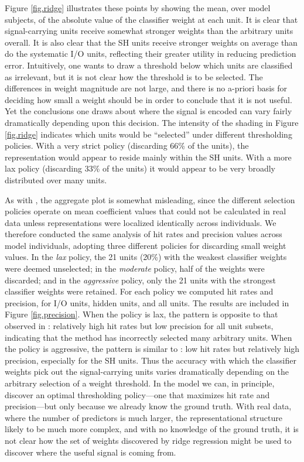 Figure \ref{fig.ridge} illustrates these points by showing the mean, over model subjects, of the absolute value of the classifier weight at each unit. It is clear that signal-carrying units receive somewhat stronger weights than the arbitrary units overall. It is also clear that the SH units receive stronger weights on average than do the systematic I/O units, reflecting their greater utility in reducing prediction error. Intuitively, one wants to draw a threshold below which units are classified as irrelevant, but it is not clear how the threshold is to be selected. The differences in weight magnitude are not large, and there is no a-priori basis for deciding how small a weight should be in order to conclude that it is not useful. Yet the conclusions one draws about where the signal is encoded can vary fairly dramatically depending upon this decision. The intensity of the shading in Figure \ref{fig.ridge} indicates which units would be ``selected'' under different thresholding policies. With a very strict policy (discarding 66\% of the units), the representation would appear to reside mainly within the SH units. With a more lax policy (discarding 33\% of the units) it would appear to be very broadly distributed over many units.

As with {\lasso}, the aggregate plot is somewhat misleading, since the different selection policies operate on mean coefficient values that could not be calculated in real data unless representations were localized identically across individuals. We therefore conducted the same analysis of hit rates and precision values across model individuals, adopting three different policies for discarding small weight values. In the {\em lax} policy, the 21 units (20\%) with the weakest classifier weights were deemed unselected; in the {\em moderate} policy, half of the weights were discarded; and in the {\em aggressive} policy, only the 21 units with the strongest classifier weights were retained. For each policy we computed hit rates and precision, for I/O units, hidden units, and all units. The results are included in Figure \ref{fig.precision}. When the policy is lax, the pattern is opposite to that observed in {\lasso}: relatively high hit rates but low precision for all unit subsets, indicating that the method has incorrectly selected many arbitrary units. When the policy is aggressive, the pattern is similar to {\lasso}: low hit rates but relatively high precision, especially for the SH units. Thus the accuracy with which the classifier weights pick out the signal-carrying units varies dramatically depending on the arbitrary selection of a weight threshold. In the model we can, in principle, discover an optimal thresholding policy---one that maximizes hit rate and precision---but only because we already know the ground truth. With real data, where the number of predictors is much larger, the representational structure likely to be much more complex, and with no knowledge of the ground truth, it is not clear how the set of weights discovered by ridge regression might be used to discover where the useful signal is coming from.  

